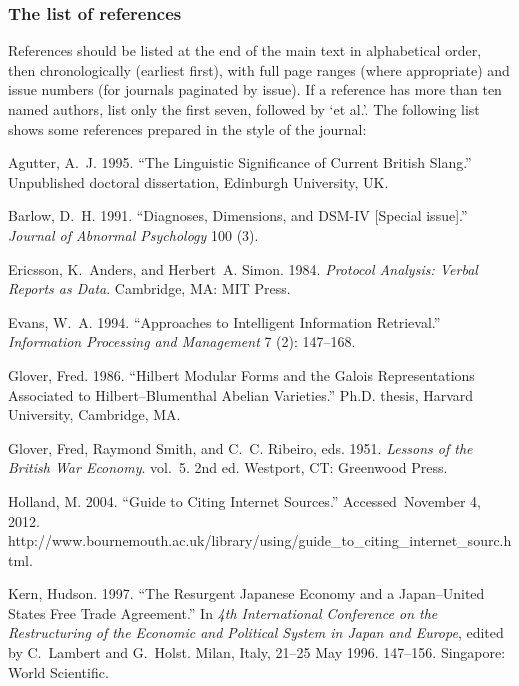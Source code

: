 \documentclass[]{tEIS2e}
\theoremstyle{plain}
\theoremstyle{remark}
\begin{document}
\subsubsection{The list of references}

References should be listed at the end of the main text in alphabetical order, then chronologically (earliest first), with full page ranges (where appropriate) and issue numbers (for journals paginated by issue). If a reference has more than ten named authors, list only the first seven, followed by `et al.'. The following list shows some references prepared in the style of the journal:

\begin{thebibliography}{12}

Agutter, A.~J. 1995. ``The Linguistic Significance of Current {B}ritish
 Slang.'' Unpublished doctoral dissertation, Edinburgh University, UK.

Barlow, D.~H. 1991. ``Diagnoses, Dimensions, and {DSM-IV} [Special issue].''
 \emph{Journal of Abnormal Psychology} 100 (3).

Ericsson, K.~Anders, and Herbert~A. Simon. 1984. \emph{Protocol Analysis:
 Verbal Reports as Data}. Cambridge, MA: MIT Press.

Evans, W.~A. 1994. ``Approaches to Intelligent Information Retrieval.''
 \emph{Information Processing and Management} 7 (2): 147--168.

Glover, Fred. 1986. ``Hilbert Modular Forms and the {G}alois Representations
 Associated to {H}ilbert--{B}lumenthal Abelian Varieties.'' Ph.D. thesis,
 Harvard University, Cambridge, MA.

Glover, Fred, Raymond Smith, and C.~C. Ribeiro, eds. 1951. \emph{Lessons of the {B}ritish War
 Economy}. vol.~5. 2nd ed. Westport, CT: Greenwood Press.

Holland, M. 2004. ``Guide to Citing Internet Sources.'' Accessed~November 4,
 2012.
 http://www.bournemouth.ac.uk/library/using/guide\_to\_citing\_internet\_sourc.html.

Kern, Hudson. 1997. ``The Resurgent {J}apanese Economy and a {J}apan--{U}nited
 {S}tates Free Trade Agreement.'' In \emph{4th International Conference on the
 Restructuring of the Economic and Political System in {J}apan and {E}urope},
 edited by C.~Lambert and G.~Holst. Milan, Italy, 21--25 May 1996. 147--156.
 Singapore: World Scientific.


\end{thebibliography}
\end{document}
